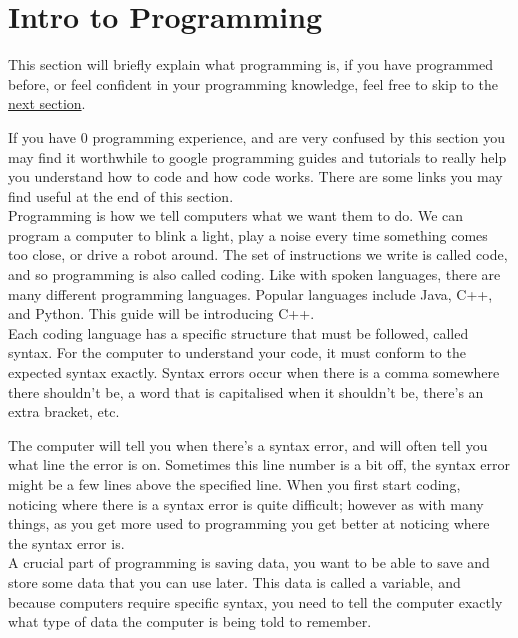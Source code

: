 \documentclass[../TinyBot.tex]{subfiles}
\begin{document}
\section{Intro to Programming}

This section will briefly explain what programming is, if you have programmed before, or feel confident in your programming knowledge, feel free to skip to the \href{sec:introarduino}{next section}.

If you have 0 programming experience, and are very confused by this section you may find it worthwhile to google programming guides and tutorials to really help you understand how to code and how code works. There are some links you may find useful at the end of this section. \\


Programming is how we tell computers what we want them to do. We can program a computer to blink a light, play a noise every time something comes too close, or drive a robot around. The set of instructions we write is called code, and so programming is also called coding. 
Like with spoken languages, there are many different programming languages. Popular languages include Java, C++, and Python. This guide will be introducing C++. \\

Each coding language has a specific structure that must be followed, called syntax. For the computer to understand your code, it must conform to the expected syntax exactly. Syntax errors occur when there is a comma somewhere there shouldn't be, a word that is capitalised when it shouldn't be, there's an extra bracket, etc.

The computer will tell you when there's a syntax error, and will often tell you what line the error is on. Sometimes this line number is a bit off, the syntax error might be a few lines above the specified line. When you first start coding, noticing where there is a syntax error is quite difficult; however as with many things, as you get more used to programming you get better at noticing where the syntax error is. \\


A crucial part of programming is saving data, you want to be able to save and store some data that you can use later. This data is called a variable, and because computers require specific syntax, you need to tell the computer exactly what type of data the computer is being told to remember.\\
\end{document}
